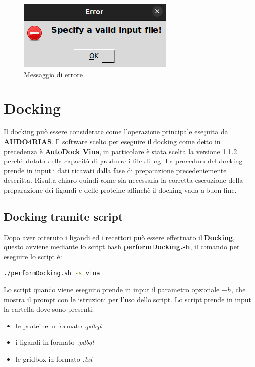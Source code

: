 \begin{figure}[H]
    \centering
    \includegraphics{immagini/capitolo3/invalidInputReceptors.png}
    \caption{Messaggio di errore}
    \label{fig:invalid input proteins}
\end{figure}

\section{Docking}
Il docking può essere considerato come l'operazione principale eseguita da \textbf{AUDO4RIAS}. Il software scelto per eseguire il docking come detto in precedenza è \textbf{AutoDock Vina}, in particolare è stata scelta la versione 1.1.2 perchè dotata della capacità di produrre i file di log.\newline
La procedura del docking prende in input i dati ricavati dalla fase di preparazione precedentemente descritta. Risulta chiaro quindi come sia necessaria la corretta esecuzione della preparazione dei ligandi e delle proteine affinchè il docking vada a buon fine.

\subsection{Docking tramite script}
Dopo aver ottenuto i ligandi ed i recettori può essere effettuato il \textbf{Docking}, questo avviene mediante lo script bash \textbf{performDocking.sh}, il comando per eseguire lo script è:

\begin{lstlisting}[language=bash, label=lst:code29, caption={Comando per eseguire performDocking}]
./performDocking.sh -s vina
\end{lstlisting}

Lo script quando viene eseguito prende in input il parametro opzionale $-h$, che mostra il prompt con le istruzioni per l'uso dello script.\newline
Lo script prende in input la cartella dove sono presenti:

\begin{itemize}
    \item le proteine in formato \textit{.pdbqt}
    \item i ligandi in formato \textit{.pdbqt}
    \item le gridbox in formato \textit{.txt}
\end{itemize}

